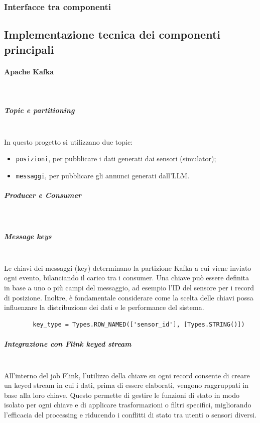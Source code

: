 \documentclass[10pt]{article}
\newcommand{\myparagraph}[1]{\paragraph{#1}\mbox{}\\}
\newcommand{\mysubparagraph}[1]{\subparagraph{#1}\mbox{}\\}
\begin{document}
\subsubsection{Interfacce tra componenti}

    \subsection{Implementazione tecnica dei componenti principali}
        \myparagraph{Apache Kafka}
            \mysubparagraph{Topic e partitioning}
        In questo progetto si utilizzano due topic:
        \begin{itemize}
        \item \texttt{posizioni}, per pubblicare i dati generati dai sensori (simulator);
        \item \texttt{messaggi}, per pubblicare gli annunci generati dall’LLM.
        \end{itemize}

        \mysubparagraph{Producer e Consumer}

        \mysubparagraph{Message keys}
        Le chiavi dei messaggi (key) determinano la partizione Kafka a cui viene inviato ogni evento, bilanciando il carico tra i consumer. Una chiave può essere definita in base a uno o più campi del messaggio, ad esempio l'ID del sensore per i record di posizione. Inoltre, è fondamentale considerare come la scelta delle chiavi possa influenzare la distribuzione dei dati e le performance del sistema.
        \begin{lstlisting}
        key_type = Types.ROW_NAMED(['sensor_id'], [Types.STRING()])
        \end{lstlisting}

        \mysubparagraph{Integrazione con Flink keyed stream}
        All’interno del job Flink, l'utilizzo della chiave su ogni record consente di creare un keyed stream
        in cui i dati, prima di essere elaborati, vengono raggruppati in base alla loro chiave. Questo permette
        di gestire le funzioni di stato in modo isolato per ogni chiave e di applicare trasformazioni o filtri
        specifici, migliorando l’efficacia del processing e riducendo i conflitti di stato tra utenti o sensori
        diversi.
\end{document}
